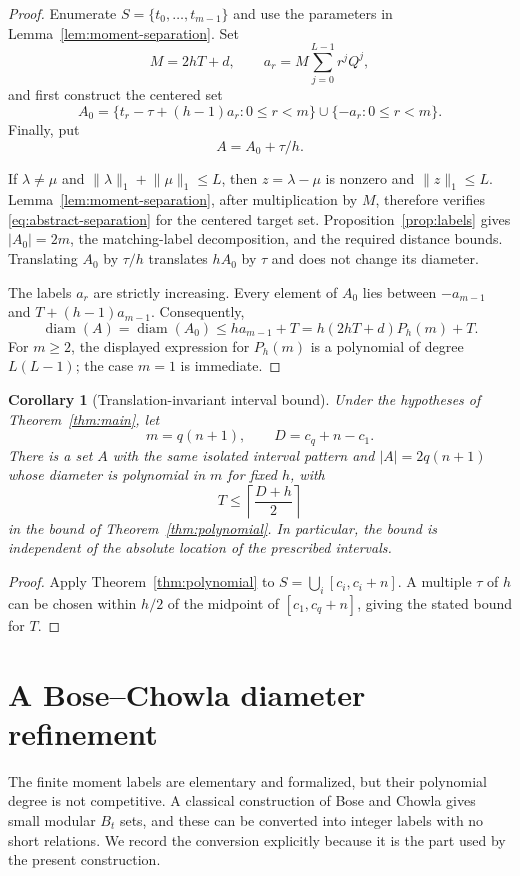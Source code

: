 \documentclass[11pt]{article}
\newtheorem{corollary}{Corollary}
\begin{document}
\begin{proof}
Enumerate $S=\{t_0,\ldots,t_{m-1}\}$ and use the parameters in
Lemma~\ref{lem:moment-separation}. Set
\[
 M=2hT+d,
 \qquad
 a_r=M\sum_{j=0}^{L-1}r^jQ^j,
\]
and first construct the centered set
\[
 A_0=
 \{t_r-\tau+(h-1)a_r:0\leq r<m\}
 \cup
 \{-a_r:0\leq r<m\}.
\]
Finally, put
\[
 A=A_0+\tau/h.
\]

If $\lambda\neq\mu$ and
$\lVert\lambda\rVert_1+\lVert\mu\rVert_1\leq L$, then
$z=\lambda-\mu$ is nonzero and $\lVert z\rVert_1\leq L$.
Lemma~\ref{lem:moment-separation}, after multiplication by $M$, therefore
verifies \eqref{eq:abstract-separation} for the centered target set.
Proposition~\ref{prop:labels} gives $|A_0|=2m$, the matching-label
decomposition, and the required distance bounds.
Translating $A_0$ by $\tau/h$ translates $hA_0$ by $\tau$ and does not change
its diameter.

The labels $a_r$ are strictly increasing. Every element of $A_0$ lies between
$-a_{m-1}$ and $T+(h-1)a_{m-1}$. Consequently,
\[
 \operatorname{diam}(A)=\operatorname{diam}(A_0)
 \leq ha_{m-1}+T
 =h(2hT+d)P_h(m)+T.
\]
For $m\geq 2$, the displayed expression for $P_h(m)$ is a polynomial of
degree $L(L-1)$; the case $m=1$ is immediate.
\end{proof}

\begin{corollary}[Translation-invariant interval bound]\label{cor:poly-interval}
Under the hypotheses of Theorem~\ref{thm:main}, let
\[
 m=q(n+1),
 \qquad
 D=c_q+n-c_1.
\]
There is a set $A$ with the same isolated interval pattern and
$|A|=2q(n+1)$ whose diameter is polynomial in $m$ for fixed $h$, with
\[
 T\leq \left\lceil\frac{D+h}{2}\right\rceil
\]
in the bound of Theorem~\ref{thm:polynomial}. In particular, the bound is
independent of the absolute location of the prescribed intervals.
\end{corollary}

\begin{proof}
Apply Theorem~\ref{thm:polynomial} to
$S=\bigcup_i[c_i,c_i+n]$. A multiple $\tau$ of $h$ can be chosen within
$h/2$ of the midpoint of $[c_1,c_q+n]$, giving the stated bound for $T$.
\end{proof}

\section{A Bose--Chowla diameter refinement}

The finite moment labels are elementary and formalized, but their polynomial
degree is not competitive. A classical construction of Bose and Chowla gives
small modular $B_t$ sets, and these can be converted into integer labels with
no short relations. We record the conversion explicitly because it is the
part used by the present construction.
\end{document}
